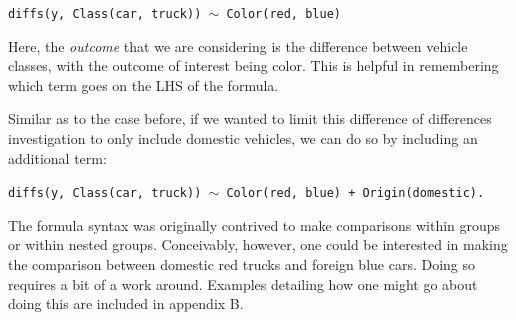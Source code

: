 \documentclass{article}
\newcommand{\xt}{\texttt}%
\begin{document}

\begin{center}
\tt diffs(y, Class(car, truck)) $\sim$ Color(red, blue)
\end{center}

Here, the \textit{outcome} that we are considering is the difference between vehicle classes, with the outcome of interest being color. This is helpful in remembering which term goes on the LHS of the formula. 

Similar as to the case before, if we wanted to limit this difference of differences investigation to only include domestic vehicles, we can do so by including an additional term:

\begin{center}
\tt diffs(y, Class(car, truck)) $\sim$ Color(red, blue) + Origin(domestic).
\end{center}

The formula syntax was originally contrived to make comparisons within groups or within nested groups. Conceivably, however, one could be interested in making the comparison between domestic red trucks and foreign blue cars. Doing so requires a bit of a work around. Examples detailing how one might go about doing this are included in appendix B. 
\end{document}
